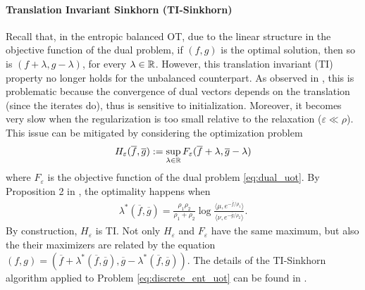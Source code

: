\paragraph{Translation Invariant Sinkhorn (TI-Sinkhorn)} Recall that, in the entropic balanced OT,
due to the linear structure in the objective function of the dual problem,
if $(f, g)$ is the optimal solution, then so is $(f + \lambda, g - \lambda)$,
for every $\lambda \in \mathbb R$. However, this translation invariant (TI) property no longer holds for
the unbalanced counterpart. As observed in \citep{Sejourne21}, this is problematic because
the convergence of dual vectors depends on the translation (since the iterates do),
thus is sensitive to initialization. Moreover, it becomes very slow when the regularization
is too small relative to the relaxation ($\varepsilon \ll \rho$).
This issue can be mitigated by considering the optimization problem
\begin{align}
  H_{\varepsilon}(\overline{f}, \overline{g}) := \sup_{\lambda \in \mathbb R}
  F_{\varepsilon}(\overline{f} + \lambda, \overline{g} - \lambda)
\end{align}
where $F_{\varepsilon}$ is the objective function of the dual problem \ref{eq:dual_uot}.
By Proposition 2 in \citep{Sejourne21}, the optimality happens when
\begin{align}
  \label{eq:optimal_lambda}
  \lambda^*(\overline{f}, \overline{g}) = \frac{\rho_1 \rho_2}{\rho_1 + \rho_2}
  \log \frac{\langle \mu, e^{-\overline{f} / \rho_1} \rangle}{\langle \nu, e^{-\overline{g} / \rho_2} \rangle}.
\end{align}
By construction, $H_{\varepsilon}$ is TI. Not only $H_{\varepsilon}$ and $F_{\varepsilon}$
have the same maximum, but also the their maximizers are related by the equation
$(f, g) = (\overline{f} + \lambda^*(\overline{f}, \overline{g}), \overline{g} - \lambda^*(\overline{f}, \overline{g}))$.
The details of the TI-Sinkhorn algorithm applied to Problem \ref{eq:discrete_ent_uot}
can be found in .


